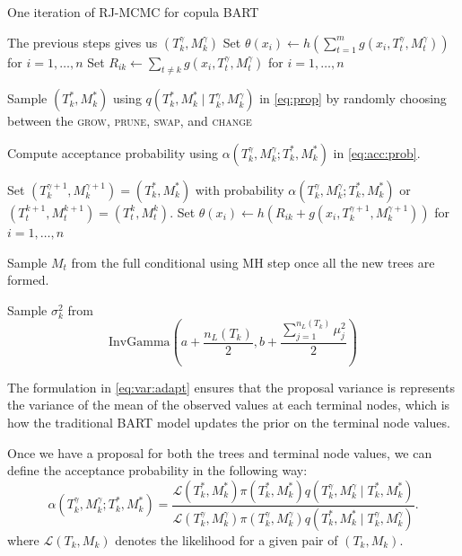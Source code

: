 \documentclass{amsart}
\begin{document}
\begin{algorithm}[H]
	\caption{One iteration of RJ-MCMC for copula BART}\label{alg:MCMC}
	\begin{algorithmic}[1]
		\State The previous steps gives us $(T_k^{\gamma},M_k^{\gamma})$
		\State Set $\theta(x_i) \leftarrow h\left(\sum_{t=1}^{m} g(x_i, T_t^{\gamma},M_t^{\gamma})\right)$ for $i = 1, \ldots, n$
		\State Set $R_{ik} \leftarrow \sum_{t\not=k}g(x_i, T_t^{\gamma},M_t^{\gamma})$ for $i = 1, \ldots, n$
		
		\State Sample $(T_k^\ast, M_k^\ast)$ using $q\left(T_k^\ast, M_k^\ast \mid T_k^{\gamma},M_k^{\gamma}\right)$ in \cref{eq:prop} by randomly choosing between the \textsc{grow}, \textsc{prune}, \textsc{swap}, and \textsc{change} 
		
		\State Compute acceptance probability using $\alpha\left(T_k^{\gamma},M_k^{\gamma};T_k^\ast, M_k^\ast\right)$ in \cref{eq:acc:prob}.
		
		\State Set $(T_k^{\gamma+1}, M_k^{\gamma+1})=(T_k^\ast, M_k^\ast)$ with probability $\alpha\left(T_k^{\gamma},M_k^{\gamma};T_k^\ast, M_k^\ast\right)$ or $(T_t^{k+1}, M_t^{k+1})=(T_t^k,M_t^k)$.
		\State Set $\theta(x_i) \leftarrow h(R_{ik} + g(x_i, T_k^{\gamma+1}, M_k^{\gamma+1}))$ for $i = 1, \ldots, n$
		
		\State Sample $M_t$ from the full conditional using MH step once all the new trees are formed.
		
		\State Sample $\sigma_{k}^2$ from 
		\begin{equation*}
			\text{InvGamma}\left(a+\frac{n_L(T_k)}{2} , b + \frac{\sum_{j=1}^{n_L(T_k)}\mu_j^2}{2}\right)
		\end{equation*}
		\EndFor
	\end{algorithmic}
\end{algorithm}

The formulation in \cref{eq:var:adapt} ensures that the proposal variance is represents the variance of the mean of the observed values at each terminal nodes, which is how the traditional BART model updates the prior on the terminal node values.


Once we have a proposal for both the trees and terminal node values, we can define the acceptance probability in the following way:
\begin{equation}\label{eq:acc:prob}
	\alpha\left(T_k^{\gamma},M_k^{\gamma};T_k^\ast, M_k^\ast\right)
	= \frac{\mathcal{L}(T_k^\ast,M_k^\ast)\pi(T_k^\ast,M_k^\ast)q\left(T_k^{\gamma},M_k^{\gamma}\mid T_k^\ast, M_k^\ast\right)}
	{\mathcal{L}(T_k^{\gamma},M_k^{\gamma})\pi(T_k^{\gamma},M_k^{\gamma}) q\left(T_k^\ast, M_k^\ast \mid T_k^{\gamma},M_k^{\gamma}\right)}.
\end{equation}
where $\mathcal{L}(T_k,M_k)$ denotes the likelihood for a given pair of $(T_k,M_k)$.
\end{document}
